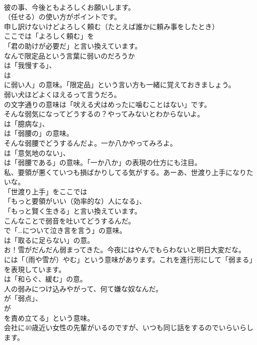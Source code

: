 \documentclass[8pt]{extreport}
\begin{document}
\begin{CJK}{UTF8}{min}
\\	彼の事、今後ともよろしくお願いします。 
\\	（任せる）の使い方がポイントです。	
\\	申し訳けないけどよろしく頼む（たとえば誰かに頼み事をしたとき） 
\\	ここでは「よろしく頼む」を
\\	「君の助けが必要だ」と言い換えています。	
\\	なんで限定品という言葉に弱いのだろうか 
\\	は「我慢する」、
\\	は
\\	に弱い人」の意味。「限定品」という言い方も一緒に覚えておきましょう。	
\\	弱い犬ほどよくほえるって言うだろ。 
\\	の文字通りの意味は「吠える犬はめったに噛むことはない」です。	
\\	そんな弱気になってどうするの？やってみないとわからないよ。 
\\	は「臆病な」、
\\	は「弱腰の」の意味。	
\\	そんな弱腰でどうするんだよ。一か八かやってみろよ。 
\\	は「意気地のない」、
\\	は「弱腰である」の意味。「一か八か」の表現の仕方にも注目。	
\\	私、要領が悪くていつも損ばかりしてる気がする。あーあ、世渡り上手になりたいな。 
\\	「世渡り上手」をここでは
\\	「もっと要領がいい（効率的な）人になる」、
\\	「もっと賢く生きる」と言い換えています。	
\\	こんなことで弱音を吐いてどうするんだ。 
\\	で「…について泣き言を言う」の意味。
\\	は「取るに足らない」の意。	
\\	お！雪がだんだん弱まってきた。今夜にはやんでもらわないと明日大変だな。 
\\	には「（雨や雪が）やむ」という意味があります。これを進行形にして「弱まる」を表現しています。
\\	は「和らぐ、緩む」の意。	
\\	人の弱みにつけ込みやがって、何て嫌な奴なんだ。 
\\	が「弱点」、
\\	が
\\	を責め立てる」という意味。	
\\	会社に40歳近い女性の先輩がいるのですが、いつも同じ話をするのでいらいらします。 

\end{CJK}
\end{document}
